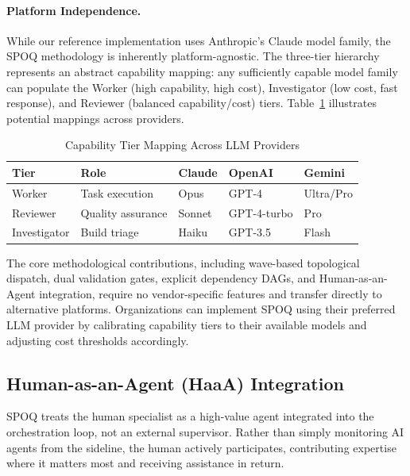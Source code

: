 \paragraph{Platform Independence.}
While our reference implementation uses Anthropic's Claude model family,
the SPOQ methodology is inherently platform-agnostic. The three-tier
hierarchy represents an abstract capability mapping: any sufficiently capable
model family can populate the Worker (high capability, high cost),
Investigator (low cost, fast response), and Reviewer (balanced capability/cost)
tiers. Table~\ref{tab:tier-mapping} illustrates potential mappings across providers.

\begin{table}[htbp]
\centering
\caption{Capability Tier Mapping Across LLM Providers}
\label{tab:tier-mapping}
\footnotesize
\begin{tabular}{lllll}
\toprule
\textbf{Tier} & \textbf{Role} & \textbf{Claude} & \textbf{OpenAI} & \textbf{Gemini} \\
\midrule
Worker & Task execution & Opus & GPT-4 & Ultra/Pro \\
Reviewer & Quality assurance & Sonnet & GPT-4-turbo & Pro \\
Investigator & Build triage & Haiku & GPT-3.5 & Flash \\
\bottomrule
\end{tabular}
\end{table}

The core methodological contributions, including wave-based topological dispatch,
dual validation gates, explicit dependency DAGs, and Human-as-an-Agent
integration, require no vendor-specific features and transfer directly
to alternative platforms. Organizations can implement SPOQ using their
preferred LLM provider by calibrating capability tiers to their available
models and adjusting cost thresholds accordingly.

\newpage
\subsection{Human-as-an-Agent (HaaA) Integration}
\label{subsec:haaa}

SPOQ treats the human specialist as a high-value agent integrated into the
orchestration loop, not an external supervisor. Rather than simply monitoring
AI agents from the sideline, the human actively participates, contributing
expertise where it matters most and receiving assistance in return.

